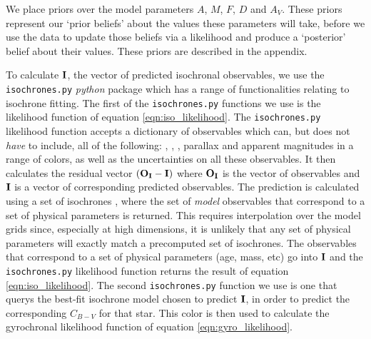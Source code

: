 We place priors over the model parameters $A$, $M$, $F$, $D$ and $A_V$.
These priors represent our `prior beliefs' about the values these parameters
will take, before we use the data to update those beliefs via a likelihood and
produce a `posterior' belief about their values.
These priors are described in the appendix.

To calculate ${\bf I}$, the vector of predicted isochronal observables, we use
the {\tt isochrones.py} {\it python} package which has a range of
functionalities relating to isochrone fitting.
The first of the {\tt isochrones.py} functions we use is the likelihood
function of equation \ref{eqn:iso_likelihood}.
The {\tt isochrones.py} likelihood function accepts a dictionary of
observables which can, but does not {\it have} to include, all of the
following: \teff, \logg, \feh, parallax and apparent magnitudes in a range of
colors, as well as the uncertainties on all these observables.
It then calculates the residual vector $({\bf O_I} - {\bf I})$ where ${\bf
O_I}$ is the vector of observables and ${\bf I}$ is a vector of corresponding
predicted observables.
The prediction is calculated using a set of isochrones \citep[we use the MIST
models][]{paxton2011, paxton2013, paxton2015, dotter2016, choi2016, paxton2018},
where the set of {\it model} observables that correspond
to a set of physical parameters is returned.
This requires interpolation over the model grids since, especially at high
dimensions, it is unlikely that any set of physical parameters will exactly
match a precomputed set of isochrones.
The observables that correspond to a set of physical parameters (age, mass,
etc) go into ${\bf I}$ and the {\tt isochrones.py} likelihood function returns
the result of equation \ref{eqn:iso_likelihood}.
The second {\tt isochrones.py} function we use is one that querys the best-fit
isochrone model chosen to predict ${\bf I}$, in order to predict the
corresponding $C_{B-V}$ for that star.
This color is then used to calculate the gyrochronal likelihood function of
equation \ref{eqn:gyro_likelihood}.

